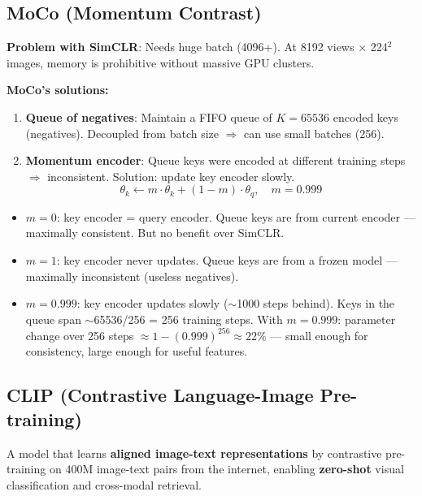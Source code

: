 \subsection{MoCo (Momentum Contrast)}
\textbf{Problem with SimCLR}: Needs huge batch (4096+). At 8192 views $\times$ 224$^2$ images, memory is prohibitive without massive GPU clusters.

\textbf{MoCo's solutions:}
\begin{enumerate}
\item \textbf{Queue of negatives}: Maintain a FIFO queue of $K = 65536$ encoded keys (negatives). Decoupled from batch size $\Rightarrow$ can use small batches (256).
\item \textbf{Momentum encoder}: Queue keys were encoded at different training steps $\Rightarrow$ inconsistent. Solution: update key encoder slowly.
$$\theta_k \leftarrow m \cdot \theta_k + (1-m) \cdot \theta_q, \quad m = 0.999$$
\end{enumerate}

\begin{keybox}[Momentum Update — Why $m=0.999$?]
\begin{itemize}
\item $m=0$: key encoder = query encoder. Queue keys are from current encoder — maximally consistent. But no benefit over SimCLR.
\item $m=1$: key encoder never updates. Queue keys are from a frozen model — maximally inconsistent (useless negatives).
\item $m=0.999$: key encoder updates slowly ($\sim$1000 steps behind). Keys in the queue span $\sim$65536/256 = 256 training steps. With $m=0.999$: parameter change over 256 steps $\approx 1-(0.999)^{256} \approx 22\%$ — small enough for consistency, large enough for useful features.
\end{itemize}
\end{keybox}

\subsection{CLIP (Contrastive Language-Image Pre-training)}

\begin{definition}
A model that learns \textbf{aligned image-text representations} by contrastive pre-training on 400M image-text pairs from the internet, enabling \textbf{zero-shot} visual classification and cross-modal retrieval.
\end{definition}


